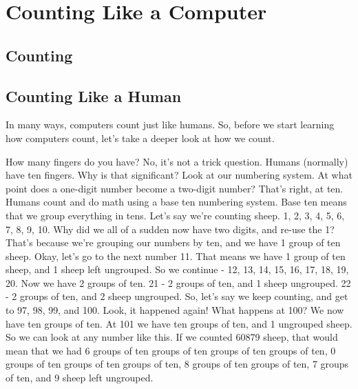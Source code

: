 \chapter{Counting Like a Computer}
\label{countingchapter}


% 
% 
% 
% 

\section{Counting}

\section{Counting Like a Human}

In many ways, computers count just like humans.  So, before we
start learning how computers count, let's take a deeper look at
how we count.

How many fingers do you have?  No, it's not a trick question.
Humans (normally) have ten fingers.  Why is that significant?
Look at our numbering system.  At what point does a one-digit
number become a two-digit number?  That's right, at ten.  Humans
count and do math using a base ten numbering system.  Base ten
means that we group everything in tens.  Let's say we're counting
sheep.  1, 2, 3, 4, 5, 6, 7, 8, 9, 10.  Why did we all of a sudden
now have two digits, and re-use the 1?  That's because we're grouping
our numbers by ten, and we have 1 group of ten sheep.  Okay, let's
go to the next number 11.  That means we have 1 group of ten sheep,
and 1 sheep left ungrouped.  So we continue - 12, 13, 14, 15, 16, 17,
18, 19, 20.  Now we have 2 groups of ten.  21 - 2 groups of ten, and
1 sheep ungrouped.  22 - 2 groups of ten, and 2 sheep ungrouped.   So,
let's say we keep counting, and get to 97, 98, 99, and 100.  Look, it
happened again!  What happens at 100?  We now have ten groups of ten.
At 101 we have ten groups of ten, and 1 ungrouped sheep.  So we can
look at any number like this.  If we counted 60879 sheep, that would
mean that we had 6 groups of ten groups of ten groups of ten groups of ten,
0 groups of ten groups of ten groups of ten, 8 groups of ten groups of ten,
7 groups of ten, and 9 sheep left ungrouped.  

